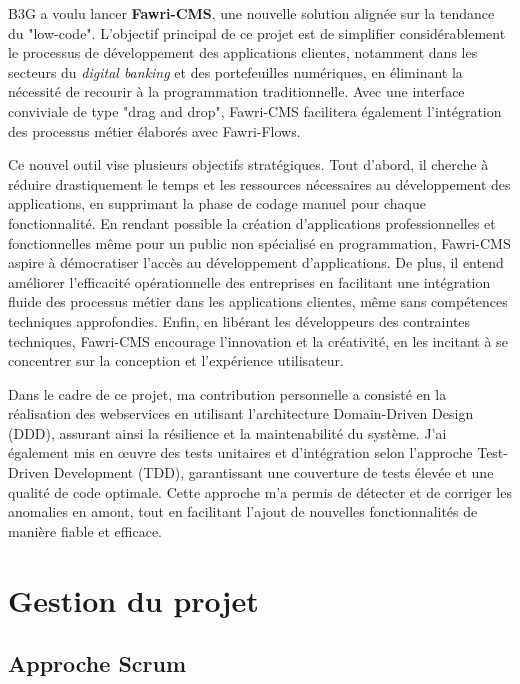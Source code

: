 \hspace{\parindent}B3G a voulu lancer \textbf{Fawri-CMS}, une nouvelle solution alignée sur la tendance du "low-code". L'objectif principal de ce projet est de simplifier considérablement le processus de développement des applications clientes, notamment dans les secteurs du \textit{digital banking} et des portefeuilles numériques, en éliminant la nécessité de recourir à la programmation traditionnelle. Avec une interface conviviale de type "drag and drop", Fawri-CMS facilitera également l'intégration des processus métier élaborés avec Fawri-Flows.

Ce nouvel outil vise plusieurs objectifs stratégiques. Tout d'abord, il cherche à réduire drastiquement le temps et les ressources nécessaires au développement des applications, en supprimant la phase de codage manuel pour chaque fonctionnalité. En rendant possible la création d'applications professionnelles et fonctionnelles même pour un public non spécialisé en programmation, Fawri-CMS aspire à démocratiser l'accès au développement d'applications. De plus, il entend améliorer l'efficacité opérationnelle des entreprises en facilitant une intégration fluide des processus métier dans les applications clientes, même sans compétences techniques approfondies. Enfin, en libérant les développeurs des contraintes techniques, Fawri-CMS encourage l'innovation et la créativité, en les incitant à se concentrer sur la conception et l'expérience utilisateur.

Dans le cadre de ce projet, ma contribution personnelle a consisté en la réalisation des webservices en utilisant l'architecture Domain-Driven Design (DDD), assurant ainsi la résilience et la maintenabilité du système. J'ai également mis en œuvre des tests unitaires et d'intégration selon l'approche Test-Driven Development (TDD), garantissant une couverture de tests élevée et une qualité de code optimale. Cette approche m'a permis de détecter et de corriger les anomalies en amont, tout en facilitant l'ajout de nouvelles fonctionnalités de manière fiable et efficace.


\section{Gestion du projet}

\subsection{Approche Scrum}

